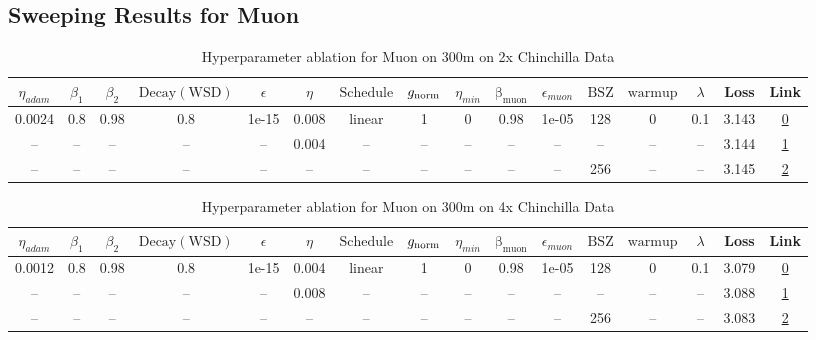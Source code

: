 \subsection{Sweeping Results for Muon}%
\begin{table}[H]
\centering
\caption{Hyperparameter ablation for Muon on 300m on 2x Chinchilla Data}
\label{tab:ablation_muon_300m_on_2x_chinchilla_data}
\begin{tabular}{cccccccccccccccc}
\toprule
$\eta_{adam}$ & $\beta_1$ & $\beta_2$ & $\mathrm{Decay (WSD)}$ & $\epsilon$ & $\eta$ & $\mathrm{Schedule}$ & $g_{\mathrm{norm}}$ & $\eta_{min}$ & $\mathrm{\beta_{muon}}$ & $\epsilon_{muon}$ & $\mathrm{BSZ}$ & $\mathrm{warmup}$ & $\lambda$ & Loss & Link \\
\midrule
0.0024 & 0.8 & 0.98 & 0.8 & 1e-15 & 0.008 & linear & 1 & 0 & 0.98 & 1e-05 & 128 & 0 & 0.1 & 3.143 & \href{https://wandb.ai/marin-community/optimizer-scaling/runs/sweep-300m-12B-muon5de1eclr0.008-wd0.1-minlr0-warmup0-b10.8-b20.-049a9e}{0} \\
\midrule
-- & -- & -- & -- & -- & 0.004 & -- & -- & -- & -- & -- & -- & -- & -- & 3.144 & \href{https://wandb.ai/marin-community/optimizer-scaling/runs/sweep-300m-12B-muon3a0740lr0.004-wd0.1-minlr0-warmup0-b10.8-b20.-732319}{1} \\
-- & -- & -- & -- & -- & -- & -- & -- & -- & -- & -- & 256 & -- & -- & 3.145 & \href{https://wandb.ai/marin-community/optimizer-scaling/runs/sweep-300m-12B-muon103aa7lr0.008-wd0.1-minlr0-warmup0-b10.8-b20.-2cbfa9}{2} \\
\bottomrule
\end{tabular}
\end{table}

\begin{table}[H]
\centering
\caption{Hyperparameter ablation for Muon on 300m on 4x Chinchilla Data}
\label{tab:ablation_muon_300m_on_4x_chinchilla_data}
\begin{tabular}{cccccccccccccccc}
\toprule
$\eta_{adam}$ & $\beta_1$ & $\beta_2$ & $\mathrm{Decay (WSD)}$ & $\epsilon$ & $\eta$ & $\mathrm{Schedule}$ & $g_{\mathrm{norm}}$ & $\eta_{min}$ & $\mathrm{\beta_{muon}}$ & $\epsilon_{muon}$ & $\mathrm{BSZ}$ & $\mathrm{warmup}$ & $\lambda$ & Loss & Link \\
\midrule
0.0012 & 0.8 & 0.98 & 0.8 & 1e-15 & 0.004 & linear & 1 & 0 & 0.98 & 1e-05 & 128 & 0 & 0.1 & 3.079 & \href{https://wandb.ai/marin-community/optimizer-scaling/runs/sweep-300m-24B-muon25115alr0.004-wd0.1-minlr0-warmup0-b10.8-b20.-f7ddef}{0} \\
\midrule
-- & -- & -- & -- & -- & 0.008 & -- & -- & -- & -- & -- & -- & -- & -- & 3.088 & \href{https://wandb.ai/marin-community/optimizer-scaling/runs/sweep-300m-24B-muond28b65lr0.008-wd0.1-minlr0-warmup0-b10.8-b20.-55461d}{1} \\
-- & -- & -- & -- & -- & -- & -- & -- & -- & -- & -- & 256 & -- & -- & 3.083 & \href{https://wandb.ai/marin-community/optimizer-scaling/runs/sweep-300m-24B-muon3a0740lr0.004-wd0.1-minlr0-warmup0-b10.8-b20.-e71893}{2} \\
\bottomrule
\end{tabular}
\end{table}

